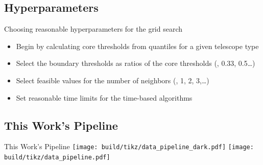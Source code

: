 \subsection{Hyperparameters}%
\label{sub:Hyperparameters}
\begin{frame}[t]{Choosing reasonable hyperparameters for the grid search}
    \begin{overlayarea}{\textwidth}{2.3cm}
        \begin{itemize}
            \item<1-> Begin by calculating core thresholds from quantiles for a given telescope type
            \item<3-> Select the boundary thresholds as ratios of the core thresholds (, 0.33, 0.5\dots)
            \item<4-> Select feasible values for the number of neighbors (, 1, 2, 3,\dots)
            \item<5-> Set reasonable time limits for the time-based algorithms
        \end{itemize}
    \end{overlayarea}
    \begin{overlayarea}{\textwidth}{\textheight}
    \end{overlayarea}
\end{frame}

\subsection{This Work's Pipeline}
\begin{frame}{This Work's Pipeline}
    {%
    \centering
    \texttt{[image: build/tikz/data\_pipeline\_dark.pdf]}
    }
    {%
    \centering
    \texttt{[image: build/tikz/data\_pipeline.pdf]}
    }
\end{frame}
